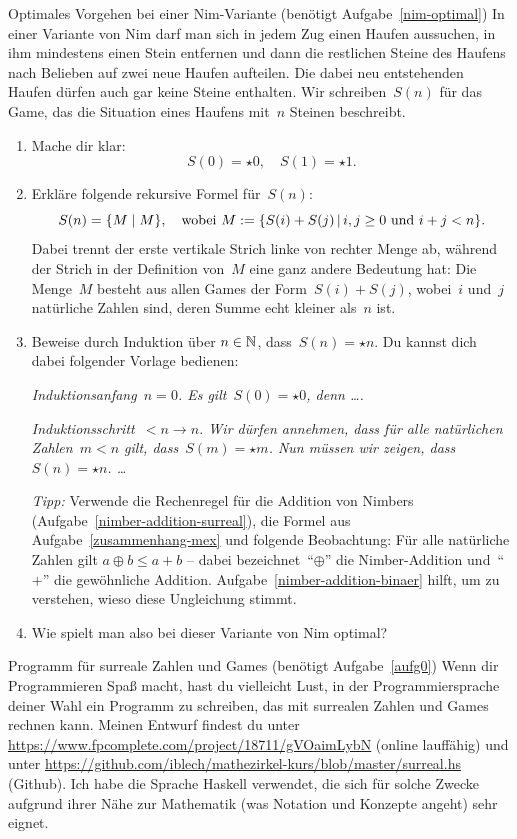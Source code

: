 \documentclass{../zirkelblatt}
\begin{document}
\begin{aufgabe}{Optimales Vorgehen bei einer Nim-Variante
(benötigt Aufgabe~\ref{nim-optimal})}
In einer Variante von Nim darf man sich in jedem Zug einen Haufen aussuchen, in
ihm mindestens einen Stein entfernen und dann die restlichen Steine des Haufens
nach Belieben auf zwei neue Haufen aufteilen. Die dabei neu entstehenden Haufen
dürfen auch gar keine Steine enthalten. Wir schreiben~$S(n)$ für das Game, das
die Situation eines Haufens mit~$n$ Steinen beschreibt.
\begin{enumerate}
\item Mache dir klar:
\[ S(0) = \star0, \quad S(1) = \star1. \]
\item Erkläre folgende rekursive Formel für~$S(n)$:
\[ S(n) = \{ M \mathrel{|} M \}, \quad \text{wobei $M := \{ S(i) + S(j) \,|\, \text{$i,j
\geq 0$ und $i+j < n$} \}$}. \]
Dabei trennt der erste vertikale Strich linke von rechter Menge ab, während
der Strich in der Definition von~$M$ eine ganz andere Bedeutung hat: Die
Menge~$M$ besteht aus allen Games der Form~$S(i) + S(j)$, wobei~$i$ und~$j$
natürliche Zahlen sind, deren Summe echt kleiner als~$n$ ist.
\item Beweise durch Induktion über $n \in \mathbb{N}$, dass~$S(n) = \star n$. Du
kannst dich dabei folgender Vorlage bedienen:

\emph{Induktionsanfang~$n = 0$. Es gilt~$S(0) = \star 0$, denn \ldots.}

\emph{Induktionsschritt~$< n \to n$. Wir dürfen annehmen, dass für alle
natürlichen Zahlen~$m < n$ gilt, dass~$S(m) = \star m$. Nun müssen wir zeigen,
dass~$S(n) = \star n$. \ldots}

\emph{Tipp:} Verwende die Rechenregel für die Addition von Nimbers
(Aufgabe~\ref{nimber-addition-surreal}), die Formel aus
Aufgabe~\ref{zusammenhang-mex} und folgende Beobachtung: Für alle natürliche
Zahlen gilt $a \oplus b \leq a + b$ -- dabei bezeichnet~"`$\oplus$"' die
Nimber-Addition und~"`$+$"' die gewöhnliche Addition.
Aufgabe~\ref{nimber-addition-binaer} hilft, um zu verstehen, wieso diese
Ungleichung stimmt.
\item Wie spielt man also bei dieser Variante von Nim optimal?
\end{enumerate}
\end{aufgabe}

\begin{aufgabe}{Programm für surreale Zahlen und Games
(benötigt Aufgabe~\ref{aufg0})}
Wenn dir Programmieren Spaß macht, hast du vielleicht Lust, in der
Programmiersprache deiner Wahl ein Programm zu schreiben, das mit surrealen
Zahlen und Games rechnen kann. Meinen Entwurf findest du unter
\url{https://www.fpcomplete.com/project/18711/gVOaimLybN} (online lauffähig)
und unter
\url{https://github.com/iblech/mathezirkel-kurs/blob/master/surreal.hs}
(Github). Ich habe die Sprache Haskell verwendet, die sich für solche Zwecke
aufgrund ihrer Nähe zur Mathematik (was Notation und Konzepte angeht) sehr
eignet.
\end{aufgabe}

\end{document}
